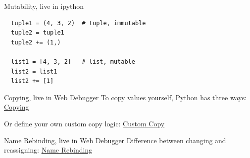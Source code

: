 \documentclass[10pt, colorlinks=true, urlcolor=blue]{beamer}
\begin{document}
\begin{frame}[fragile]{Mutability, live in ipython}
  \begin{verbatim}
  tuple1 = (4, 3, 2)  # tuple, immutable
  tuple2 = tuple1
  tuple2 += (1,)

  list1 = [4, 3, 2]   # list, mutable
  list2 = list1
  list2 += [1]
  \end{verbatim}
\end{frame}

\begin{frame}[fragile]{Copying, live in Web Debugger}
  To copy values yourself, Python has three ways:
 \href{https://memory-graph.com/#code=import+copy%0A%0Aa+%3D+%5B+%5B1%2C+2%5D%2C+%5B%27x%27%2C+%27y%27%5D+%5D%0A%0Ac1+%3D+a++++++++++++++++%0Ac2+%3D+copy.copy%28a%29+++++%0Ac3+%3D+copy.deepcopy%28a%29+%0A%0A%23+c1%3A+assignment%2C+++nothing+is+copied%2C+everything+is+shared%0A%23+c2%3A+shallow+copy%2C+first+element+is+copied%2C+underlying+is+shared%0A%23+c3%3A+deep+copy%2C++++everything+is+copied%2C+nothing+is+shared%0A}{Copying} \\
 \vspace{1em}

 Or define your own custom copy logic:
 \href{https://memory-graph.com/#code=import+copy%0A%0Aa+%3D+%5B+%5B1%2C+2%5D%2C+%5B%27x%27%2C+%27y%27%5D+%5D%0A%0Ac1+%3D+a++++++++++++++++%0Ac2+%3D+copy.copy%28a%29+++++%0Ac3+%3D+copy.deepcopy%28a%29+%0A%0A%23+c1%3A+assignment%2C+++nothing+is+copied%2C+everything+is+shared%0A%23+c2%3A+shallow+copy%2C+first+element+is+copied%2C+underlying+is+shared%0A%23+c3%3A+deep+copy%2C++++everything+is+copied%2C+nothing+is+shared%0A%0Adef+custom_copy%28a%29%3A%0A++++c+%3D+a.copy%28%29+%23+shallow+copy%0A++++c%5B1%5D+%3D+a%5B1%5D.copy%28%29%0A++++return+c%0A++++%0Ac4+%3D+custom_copy%28a%29%0A%0A%23+c4%3A+custom+copy%2C+++you+decide+what+is+copied+and+shared%0A&breakpoints=18}{Custom Copy}
\end{frame}


\begin{frame}[fragile]{Name Rebinding, live in Web Debugger}
  Difference between changing and reassigning:
  \href{https://memory-graph.com/#code=%0Aa+%3D+%5B4%2C+3%2C+2%5D%0Ab+%3D+a%0A%0Ab+%2B%3D+%5B1%5D++++++++%23+changing+%27b%27+changes+%27a%27%0Ab+%3D+%5B100%2C+200%5D++%23+but+reassignment+rebinds+%27b%27+to+another+value%2C+%27a%27+is+uneffected%0A}{Name Rebinding}
\end{frame}
\end{document}
